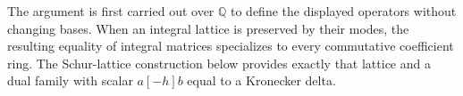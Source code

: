 The argument is first carried out over $\mathbb Q$ to define the
displayed operators without changing bases. When an integral lattice
is preserved by their modes, the resulting equality of integral
matrices specializes to every commutative coefficient ring. The
Schur-lattice construction below provides exactly
that lattice and a dual family with scalar $a[-h]b$ equal to a
Kronecker delta.
